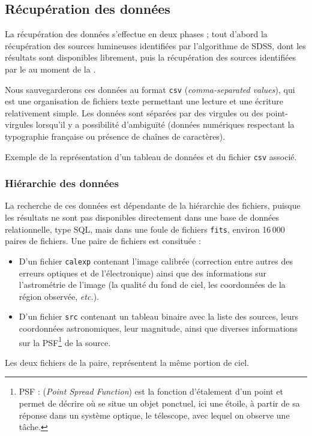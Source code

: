 	\subsection{Récupération des données}

La récupération des données s'effectue en deux phases ; tout d'abord la récupération des sources lumineuses identifiées par l'algorithme de SDSS, dont les résultats sont disponibles librement, puis la récupération des sources identifiées par le \stack{} au moment de la \DC.

Nous sauvegarderons ces données au format \texttt{csv} (\emph{comma-separated values}), qui est une organisation de fichiers texte permettant une lecture et une écriture relativement simple. Les données sont séparées par des virgules ou des point-virgules lorsqu'il y a possibilité d'ambiguïté (données numériques respectant la typographie française \cite[p.~124]{IN} ou présence de chaînes de caractères).

	\begin{table}[h]%
		\centering
		\hspace{1em}
		\caption[Représentation d'un tableau et du fichier \texttt{csv} associé]{Exemple de la représentation d'un tableau de données et du fichier \texttt{csv} associé.}%
	\end{table}

		\subsubsection{Hiérarchie des données}

La recherche de ces données est dépendante de la hiérarchie des fichiers, puisque les résultats ne sont pas disponibles directement dans une base de données relationnelle, type SQL, mais dans une foule de fichiers \texttt{fits}, environ 16\,000 paires de fichiers. Une paire de fichiers est consituée :
	\begin{itemize}
		\item D'un fichier \texttt{calexp} contenant l'image calibrée (correction entre autres des erreurs optiques et de l'électronique) ainsi que des informations sur l'astrométrie de l'image (la qualité du fond de ciel, les coordonnées de la région observée, \emph{etc.}).
		\item D'un fichier \texttt{src} contenant un tableau binaire avec la liste des sources, leurs coordonnées astronomiques, leur magnitude, ainsi que diverses informations sur la PSF\footnote{PSF : (\emph{Point Spread Function}) est la fonction d'étalement d'un point et permet de décrire où se situe un objet ponctuel, ici une étoile, à partir de sa réponse dans un système optique, le télescope, avec lequel on observe une tâche.} de la source.
	\end{itemize}
Les deux fichiers de la paire, représentent la même portion de ciel.

